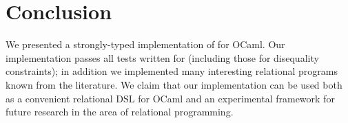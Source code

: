 

\section{Conclusion}

We presented a strongly-typed implementation of \miniKanren for OCaml. Our implementation
passes all tests written for \miniKanren (including those for disequality constraints);
in addition we implemented many interesting relational programs known from
the literature. We claim that our implementation can be used both as a convenient
relational DSL for OCaml and an experimental framework for future research in the area of
relational programming.

